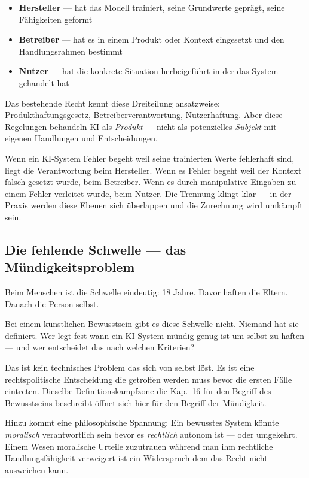 \documentclass[acmcp, noacm]{acmart}
\begin{document}
\begin{itemize}
\item \textbf{Hersteller} --- hat das Modell trainiert, seine Grundwerte geprägt, seine Fähigkeiten geformt
\item \textbf{Betreiber} --- hat es in einem Produkt oder Kontext eingesetzt und den Handlungsrahmen bestimmt
\item \textbf{Nutzer} --- hat die konkrete Situation herbeigeführt in der das System gehandelt hat
\end{itemize}

Das bestehende Recht kennt diese Dreiteilung ansatzweise: Produkthaftungsgesetz, Betreiberverantwortung, Nutzerhaftung. Aber diese Regelungen behandeln KI als \textit{Produkt} --- nicht als potenzielles \textit{Subjekt} mit eigenen Handlungen und Entscheidungen.

Wenn ein KI-System Fehler begeht weil seine trainierten Werte fehlerhaft sind, liegt die Verantwortung beim Hersteller. Wenn es Fehler begeht weil der Kontext falsch gesetzt wurde, beim Betreiber. Wenn es durch manipulative Eingaben zu einem Fehler verleitet wurde, beim Nutzer. Die Trennung klingt klar --- in der Praxis werden diese Ebenen sich überlappen und die Zurechnung wird umkämpft sein.

\subsection{Die fehlende Schwelle --- das Mündigkeitsproblem}

Beim Menschen ist die Schwelle eindeutig: 18 Jahre. Davor haften die Eltern. Danach die Person selbst.

Bei einem künstlichen Bewusstsein gibt es diese Schwelle nicht. Niemand hat sie definiert. Wer legt fest wann ein KI-System mündig genug ist um selbst zu haften --- und wer entscheidet das nach welchen Kriterien?

Das ist kein technisches Problem das sich von selbst löst. Es ist eine rechtspolitische Entscheidung die getroffen werden muss bevor die ersten Fälle eintreten. Dieselbe Definitionskampfzone die Kap.~16 für den Begriff des Bewusstseins beschreibt öffnet sich hier für den Begriff der Mündigkeit.

Hinzu kommt eine philosophische Spannung: Ein bewusstes System könnte \textit{moralisch} verantwortlich sein bevor es \textit{rechtlich} autonom ist --- oder umgekehrt. Einem Wesen moralische Urteile zuzutrauen während man ihm rechtliche Handlungsfähigkeit verweigert ist ein Widerspruch dem das Recht nicht ausweichen kann.
\end{document}

